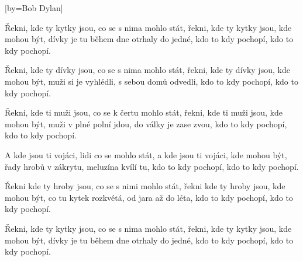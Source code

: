 [by={Bob Dylan}]

\beginverse{}
Řekni, kde ty kytky jsou, co se s nima mohlo stát,
řekni, kde ty kytky jsou, kde mohou být,
dívky je tu během dne otrhaly do jedné,
kdo to kdy pochopí, kdo to kdy pochopí.
\endverse{}

\beginverse{}
\chordsoff{}
Řekni, kde ty dívky jsou, co se s nima mohlo stát,
řekni, kde ty dívky jsou, kde mohou být,
muži si je vyhlédli, s sebou domů odvedli,
kdo to kdy pochopí, kdo to kdy pochopí.
\chordson{}
\endverse{}

\beginverse{}
\chordsoff{}
Řekni, kde ti muži jsou, co se k čertu mohlo stát,
řekni, kde ti muži jsou, kde mohou být,
muži v plné polní jdou, do války je zase zvou,
kdo to kdy pochopí, kdo to kdy pochopí.
\chordson{}
\endverse{}

\beginverse{}
\chordsoff{}
A kde jsou ti vojáci, lidi co se mohlo stát,
a kde jsou ti vojáci, kde mohou být,
řady hrobů v zákrytu, meluzína kvílí tu,
kdo to kdy pochopí, kdo to kdy pochopí.
\chordson{}
\endverse{}

\beginverse{}
\chordsoff{}
Řekni kde ty hroby jsou, co se s nimi mohlo stát,
řekni kde ty hroby jsou, kde mohou být,
co tu kytek rozkvétá, od jara až do léta,
kdo to kdy pochopí, kdo to kdy pochopí.
\chordson{}
\endverse{}

\beginverse{}
\chordsoff{}
Řekni, kde ty kytky jsou, co se s nima mohlo stát,
řekni, kde ty kytky jsou, kde mohou být,
dívky je tu během dne otrhaly do jedné,
kdo to kdy pochopí, kdo to kdy pochopí.
\chordson{}
\endverse{}

\endsong{}
